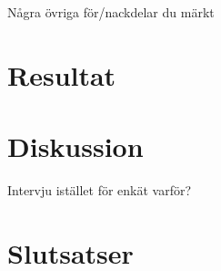 Några övriga för/nackdelar du märkt 

\section{Resultat}
\section{Diskussion}
Intervju istället för enkät varför?
\section{Slutsatser}





